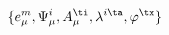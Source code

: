 \begin{equation}
\{ e_{\mu}^{m}, \Psi_{\mu}^{i}, A_{\mu}^{\ti}, \lambda^{i\ta}, \varphi^{\tx}\}
\end{equation}

